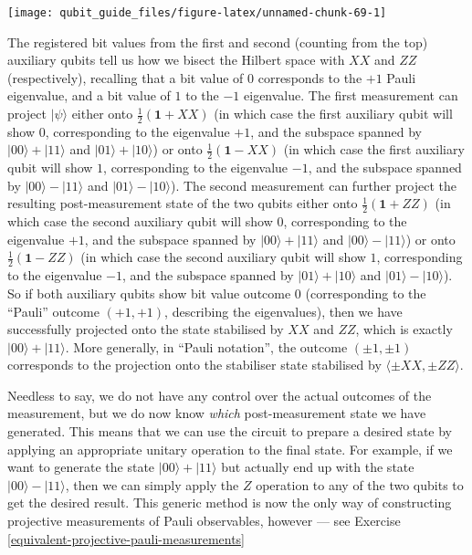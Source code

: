 \documentclass[fleqn]{article}
\begin{document}
\begin{center}\texttt{[image: qubit\_guide\_files/figure-latex/unnamed-chunk-69-1]} \end{center}

The registered bit values from the first and second (counting from the top) auxiliary qubits tell us how we bisect the Hilbert space with \(XX\) and \(ZZ\) (respectively), recalling that a bit value of \(0\) corresponds to the \(+1\) Pauli eigenvalue, and a bit value of \(1\) to the \(-1\) eigenvalue.
The first measurement can project \(|\psi\rangle\) either onto \(\frac{1}{2}(\mathbf{1}+XX)\) (in which case the first auxiliary qubit will show \(0\), corresponding to the eigenvalue \(+1\), and the subspace spanned by \(|00\rangle+|11\rangle\) and \(|01\rangle+|10\rangle\)) or onto \(\frac{1}{2}(\mathbf{1}-XX)\) (in which case the first auxiliary qubit will show \(1\), corresponding to the eigenvalue \(-1\), and the subspace spanned by \(|00\rangle-|11\rangle\) and \(|01\rangle-|10\rangle\)).
The second measurement can further project the resulting post-measurement state of the two qubits either onto \(\frac{1}{2}(\mathbf{1}+ZZ)\) (in which case the second auxiliary qubit will show \(0\), corresponding to the eigenvalue \(+1\), and the subspace spanned by \(|00\rangle+|11\rangle\) and \(|00\rangle-|11\rangle\)) or onto \(\frac{1}{2}(\mathbf{1}-ZZ)\) (in which case the second auxiliary qubit will show \(1\), corresponding to the eigenvalue \(-1\), and the subspace spanned by \(|01\rangle+|10\rangle\) and \(|01\rangle-|10\rangle\)).
So if both auxiliary qubits show bit value outcome \(0\) (corresponding to the ``Pauli'' outcome \((+1,+1)\), describing the eigenvalues), then we have successfully projected onto the state stabilised by \(XX\) and \(ZZ\), which is exactly \(|00\rangle+|11\rangle\).
More generally, in ``Pauli notation'', the outcome \((\pm1,\pm1)\) corresponds to the projection onto the stabiliser state stabilised by \(\langle\pm XX,\pm ZZ\rangle\).

Needless to say, we do not have any control over the actual outcomes of the measurement, but we do now know \emph{which} post-measurement state we have generated.
This means that we can use the circuit to prepare a desired state by applying an appropriate unitary operation to the final state.
For example, if we want to generate the state \(|00\rangle+|11\rangle\) but actually end up with the state \(|00\rangle-|11\rangle\), then we can simply apply the \(Z\) operation to any of the two qubits to get the desired result.
This generic method is now the only way of constructing projective measurements of Pauli observables, however --- see Exercise \ref{equivalent-projective-pauli-measurements}
\end{document}
